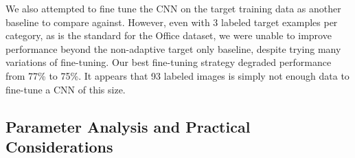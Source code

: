 
 


We also attempted to fine tune the CNN on the target training data as another
baseline to compare against. However, even with 3 labeled target examples per
category, as is the standard for the Office dataset, we were unable to improve
performance beyond the non-adaptive target only baseline, despite trying many
variations of fine-tuning. Our best fine-tuning strategy degraded performance
from 77\% to 75\%. It appears that 93 labeled images is simply not enough data
to fine-tune a CNN of this size.

\subsection{Parameter Analysis and Practical Considerations}
\label{sec:analysis}




